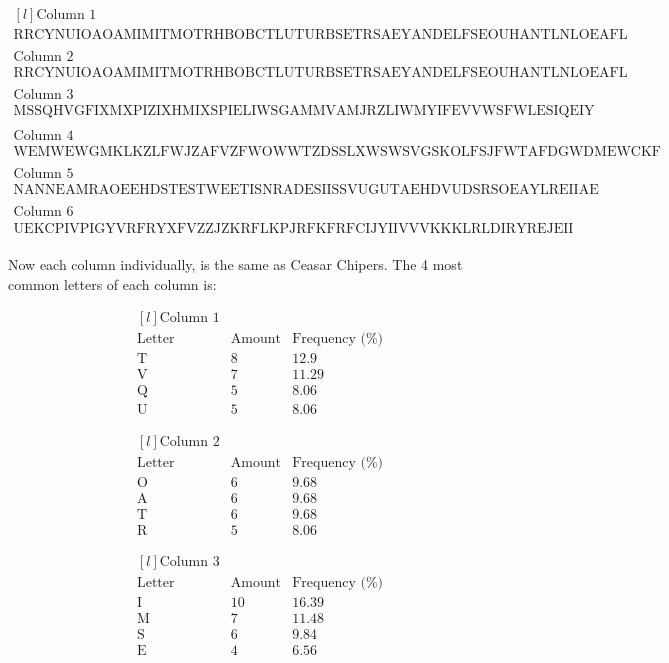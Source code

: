 \documentclass{article}
\begin{document}
	\[
	\begin{matrix*}[l]
	\text{Column 1}\\
	\text{RRCYNUIOAOAMIMITMOTRHBOBCTLUTURBSETRSAEYANDELFSEOUHANTLNLOEAFL}\\
	\\
	\text{Column 2}\\
	\text{RRCYNUIOAOAMIMITMOTRHBOBCTLUTURBSETRSAEYANDELFSEOUHANTLNLOEAFL}\\
	\\
	\text{Column 3}\\
	\text{MSSQHVGFIXMXPIZIXHMIXSPIELIWSGAMMVAMJRZLIWMYIFEVVWSFWLESIQEIY}\\
	\\
	\text{Column 4}\\
	\text{WEMWEWGMKLKZLFWJZAFVZFWOWWTZDSSLXWSWSVGSKOLFSJFWTAFDGWDMEWCKF}\\
	\\
	\text{Column 5}\\
	\text{NANNEAMRAOEEHDSTESTWEETISNRADESIISSVUGUTAEHDVUDSRSOEAYLREIIAE}\\
	\\
	\text{Column 6}\\
	\text{UEKCPIVPIGYVRFRYXFVZZJZKRFLKPJRFKFRFCIJYIIVVVKKKLRLDIRYREJEII}
	\end{matrix*}
	\]
	\\
	Now each column individually, is the same as Ceasar Chipers. The 4 most common letters of each column is:
	
	\[
	\begin{matrix*}[l]
	\text{Column 1} \\
	\text{Letter} & \text{Amount} & \text{Frequency (\%)} \\
	\text{T} & 8&12.9 \\
	\text{V} & 7&11.29 \\
	\text{Q} & 5&8.06 \\
	\text{U} & 5&8.06
	\end{matrix*}
	\]
	
	\[
	\begin{matrix*}[l]
	\text{Column 2} \\
	\text{Letter} & \text{Amount} & \text{Frequency (\%)} \\
	\text{O} & 6&9.68 \\
	\text{A} & 6&9.68 \\
	\text{T} & 6&9.68 \\
	\text{R} & 5&8.06
	\end{matrix*}
	\]
	
	\[
	\begin{matrix*}[l]
	\text{Column 3} \\
	\text{Letter} & \text{Amount} & \text{Frequency (\%)} \\
	\text{I} & 10&16.39 \\
	\text{M} & 7&11.48 \\
	\text{S} & 6&9.84 \\
	\text{E} & 4&6.56
	\end{matrix*}
	\]
	
\end{document}
